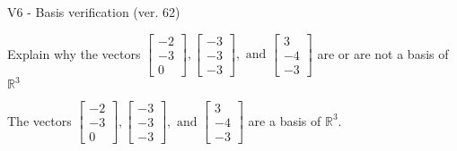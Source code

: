 \begin{exercise}
  \begin{exerciseTitle}V6 - Basis verification (ver. 62)\end{exerciseTitle}
  \begin{exerciseStatement}
    Explain why the vectors \(\left[\begin{array}{r}
-2 \\
-3 \\
0
\end{array}\right] , \left[\begin{array}{r}
-3 \\
-3 \\
-3
\end{array}\right] , \text{ and } \left[\begin{array}{r}
3 \\
-4 \\
-3
\end{array}\right]\) are or are not a basis of \(\mathbb{R}^3\)	


  \end{exerciseStatement}
  \begin{exerciseAnswer}
   The vectors \(\left[\begin{array}{r}
-2 \\
-3 \\
0
\end{array}\right] , \left[\begin{array}{r}
-3 \\
-3 \\
-3
\end{array}\right] , \text{ and } \left[\begin{array}{r}
3 \\
-4 \\
-3
\end{array}\right]\) 
  	 are  a basis of \(\mathbb{R}^3\).
  


  \end{exerciseAnswer}
\end{exercise}